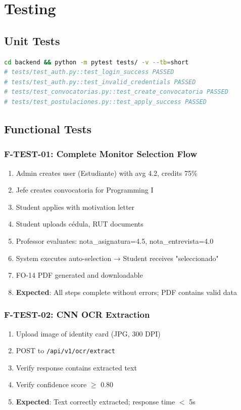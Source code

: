 \documentclass[12pt,a4paper]{report}
\begin{document}
\chapter{Testing}

\section{Unit Tests}
\begin{lstlisting}[language=bash]
cd backend && python -m pytest tests/ -v --tb=short
# tests/test_auth.py::test_login_success PASSED
# tests/test_auth.py::test_invalid_credentials PASSED
# tests/test_convocatorias.py::test_create_convocatoria PASSED
# tests/test_postulaciones.py::test_apply_success PASSED
\end{lstlisting}

\section{Functional Tests}

\subsection{F-TEST-01: Complete Monitor Selection Flow}
\begin{enumerate}
    \item Admin creates user (Estudiante) with avg 4.2, credits 75\%
    \item Jefe creates convocatoria for Programming I
    \item Student applies with motivation letter
    \item Student uploads cédula, RUT documents
    \item Professor evaluates: nota\_asignatura=4.5, nota\_entrevista=4.0
    \item System executes auto-selection → Student receives "seleccionado"
    \item FO-14 PDF generated and downloadable
    \item \textbf{Expected}: All steps complete without errors; PDF contains valid data
\end{enumerate}

\subsection{F-TEST-02: CNN OCR Extraction}
\begin{enumerate}
    \item Upload image of identity card (JPG, 300 DPI)
    \item POST to \texttt{/api/v1/ocr/extract}
    \item Verify response contains extracted text
    \item Verify confidence score $\geq$ 0.80
    \item \textbf{Expected}: Text correctly extracted; response time $<$ 5s
\end{enumerate}
\end{document}
